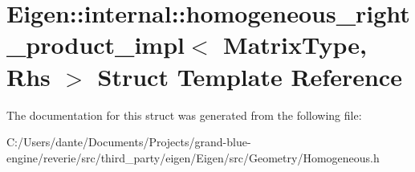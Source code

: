 \hypertarget{struct_eigen_1_1internal_1_1homogeneous__right__product__impl}{}\section{Eigen\+::internal\+::homogeneous\+\_\+right\+\_\+product\+\_\+impl$<$ Matrix\+Type, Rhs $>$ Struct Template Reference}
\label{struct_eigen_1_1internal_1_1homogeneous__right__product__impl}


The documentation for this struct was generated from the following file\+:\begin{DoxyCompactItemize}
\item 
C\+:/\+Users/dante/\+Documents/\+Projects/grand-\/blue-\/engine/reverie/src/third\+\_\+party/eigen/\+Eigen/src/\+Geometry/Homogeneous.\+h\end{DoxyCompactItemize}
